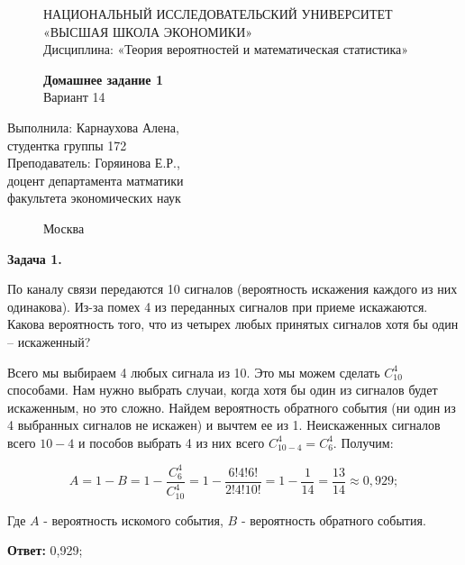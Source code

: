 \documentclass[]{article}
\begin{document}
	\begin{figure}[t]
		\centering
		\large
		НАЦИОНАЛЬНЫЙ ИССЛЕДОВАТЕЛЬСКИЙ УНИВЕРСИТЕТ\\
		«ВЫСШАЯ ШКОЛА ЭКОНОМИКИ»\\
		Дисциплина: «Теория вероятностей и математическая статистика»
	\end{figure}
	
	\begin{figure}[h]
	\vspace{3in}
	\centering
	\Huge
	\textbf{Домашнее задание 1}\\
	Вариант 14 
	\end{figure}
	
	\vspace{2in}
	\Large
	\raggedleft
	Выполнила: Карнаухова Алена,\\
	студентка группы 172\\
	\vspace{12pt}
	Преподаватель: Горяинова Е.Р.,\\
	доцент департамента матматики\\
	факультета экономических наук
	
	\begin{figure}[b]
		\centering
		Москва \the\year
	\end{figure}
	
	\thispagestyle{empty}
	
	\newpage
	
	\centering
	\large
	\textbf{Задача 1.}
	
	\vspace{10pt}
	
	\raggedright

	По каналу связи передаются 10 сигналов (вероятность искажения каждого
из них одинакова). Из-за помех 4 из переданных сигналов при приеме искажаются. Какова
вероятность того, что из четырех любых принятых сигналов хотя бы один – искаженный?	

	\vspace{20pt}
	
	Всего мы выбираем 4 любых сигнала из 10. Это мы можем сделать $C_{10}^4$ способами. Нам нужно выбрать случаи, когда хотя бы один из сигналов будет искаженным, но это сложно. Найдем вероятность обратного события (ни один из 4 выбранных сигналов не искажен) и вычтем ее из 1. Неискаженных сигналов всего $10-4$ и пособов выбрать 4 из них всего $C_{10-4}^4 = C_{6}^4$. Получим:
	
	\begin{equation}
	A = 1 - B = 1 - \frac{C_6^4}{C_{10}^4} = 1 - \frac{6!4!6!}{2!4!10!} = 1 - \frac{1}{14} = \frac{13}{14} \approx 0,929;
	\end{equation}
	
	Где $A$ - вероятность искомого события, $B$ - вероятность обратного события.
	
	\vspace{10pt}
	
	\textbf{Ответ:} 0,929;
	
\end{document}
